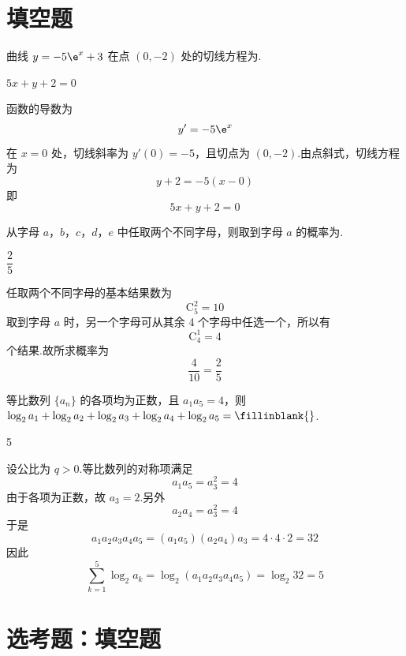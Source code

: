 \section{填空题}

\begin{problem}
曲线 \(y = -5\e^{x} + 3\) 在点 \((0, -2)\) 处的切线方程为\fillinblank{}.
\end{problem}

\begin{answer}
\(5x + y + 2 = 0\)
\end{answer}

\begin{solution}
函数的导数为
\[
y'=-5\e^x
\]
在 \(x=0\) 处，切线斜率为 \(y'(0)=-5\)，且切点为 \((0,-2)\).由点斜式，切线方程为
\[
y+2=-5(x-0)
\]
即
\[
5x+y+2=0
\]
\end{solution}

\begin{problem}
从字母 \(a\)，\(b\)，\(c\)，\(d\)，\(e\) 中任取两个不同字母，则取到字母 \(a\) 的概率为\fillinblank{}.
\end{problem}

\begin{answer}
\(\dfrac{2}{5}\)
\end{answer}

\begin{solution}
任取两个不同字母的基本结果数为
\[
\mathrm C_5^2=10
\]
取到字母 \(a\) 时，另一个字母可从其余 4 个字母中任选一个，所以有
\[
\mathrm C_4^1=4
\]
个结果.故所求概率为
\[
\frac{4}{10}=\frac{2}{5}
\]
\end{solution}

\begin{problem}
等比数列 \(\{a_{n}\}\) 的各项均为正数，且 \(a_{1}a_{5} = 4\)，则 \(\log_{2} a_{1} + \log_{2} a_{2} + \log_{2} a_{3} + \log_{2} a_{4} + \log_{2} a_{5} =\fillinblank{}\).
\end{problem}

\begin{answer}
5
\end{answer}

\begin{solution}
设公比为 \(q>0\).等比数列的对称项满足
\[
a_1a_5=a_3^2=4
\]
由于各项为正数，故 \(a_3=2\).另外
\[
a_2a_4=a_3^2=4
\]
于是
\[
a_1a_2a_3a_4a_5=(a_1a_5)(a_2a_4)a_3=4\cdot4\cdot2=32
\]
因此
\[
\sum_{k=1}^{5}\log_2a_k
=\log_2\left(a_1a_2a_3a_4a_5\right)
=\log_2 32=5
\]
\end{solution}

\section{选考题：填空题}

